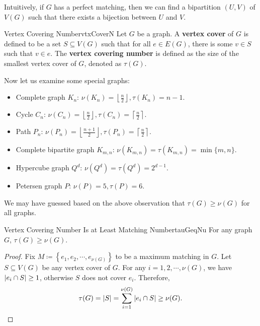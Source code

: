 \documentclass[math, code]{amznotes}
\theoremstyle{remark}
\begin{document}
Intuitively, if $G$ has a perfect matching, then we can find a bipartition $(U, V)$ of $V(G)$ such that there exists a bijection between $U$ and $V$.
\begin{dfnbox}{Vertex Covering Number}{vtxCoverN}
    Let $G$ be a graph. A {\color{red} \textbf{vertex cover}} of $G$ is defined to be a set $S \subseteq V(G)$ such that for all $e \in E(G)$, there is some $v \in S$ such that $v \in e$. The {\color{red} \textbf{vertex covering number}} is defined as the size of the smallest vertex cover of $G$, denoted as $\tau(G)$.
\end{dfnbox}
Now let us examine some special graphs:
\begin{itemize}
    \item Complete graph $K_n$: $\nu(K_n) = \left\lfloor\frac{n}{2}\right\rfloor, \tau(K_n) = n - 1$.
    \item Cycle $C_n$: $\nu(C_n) = \left\lfloor\frac{n}{2}\right\rfloor, \tau(C_n) = \left\lceil\frac{n}{2}\right\rceil$.
    \item Path $P_n$: $\nu(P_n) = \left\lfloor\frac{n + 1}{2}\right\rfloor, \tau(P_n) = \left\lceil\frac{n}{2}\right\rceil$.
    \item Complete bipartite graph $K_{m, n}$: $\nu(K_{m, n}) = \tau(K_{m, n}) = \min\{m, n\}$.
    \item Hypercube graph $Q^d$: $\nu(Q^d) = \tau(Q^d) = 2^{d - 1}$.
    \item Petersen graph $P$: $\nu(P) = 5, \tau(P) = 6$.
\end{itemize}
We may have guessed based on the above observation that $\tau(G) \geq \nu(G)$ for all graphs.
\begin{probox}{Vertex Covering Number Is at Least Matching Number}{tauGeqNu}
    For any graph $G$, $\tau(G) \geq \nu(G)$.
    \tcblower
    \begin{proof}
        Fix $M \coloneqq \left\{e_1, e_2, \cdots, e_{\nu(G)}\right\}$ to be a maximum matching in $G$. Let $S \subseteq V(G)$ be any vertex cover of $G$. For any $i = 1, 2, \cdots, \nu(G)$, we have ${\left\lvert {e_i \cap S} \right\rvert} \geq 1$, otherwise $S$ does not cover $e_i$. Therefore,
        \begin{equation*}
            \tau(G) = {\left\lvert {S} \right\rvert} = \sum_{i = 1}^{\nu(G)}{\left\lvert {e_i \cap S} \right\rvert} \geq \nu(G).
        \end{equation*}
    \end{proof}
\end{probox}
\end{document}
